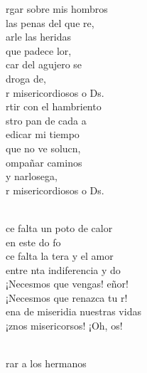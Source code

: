 \documentclass[12pt]{article}
\begin{document}
\begin{multicols*}{2}
\begin{cancion}%
	rgar sobre mis hombros \\
	 las penas del que re,\\
	arle las heridas\\
	 que padece lor,\\
	car del agujero se \\
	 droga de,\\
	r misericordiosos o Ds.\\
	rtir con el hambriento \\
	stro pan de cada a\\
	edicar mi tiempo \\
	 que no ve solucn, \\
	ompañar caminos \\
	y narlosega,\\
	r misericordiosos o Ds.\\\jump\\
	\begin{chorus}%
	ce falta un poto de calor \\
	en este do fo\\
	ce falta la tera y el amor \\
	entre nta indiferencia y do\\
	¡Necesmos que vengas! eñor!\\
	¡Necesmos que renazca tu r!\\
	ena de miseridia nuestras vidas\\
	¡znos misericorsos! ¡Oh, os! \\
	\end{chorus}%
	\jump\\
	rar a los hermanos \\

\end{cancion}
\end{multicols*}
\end{document}
